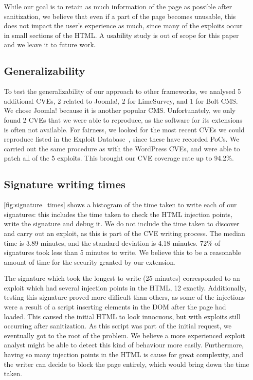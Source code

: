 While our goal is to retain as much information of the page as
possible after sanitization, we believe that even if a part of the
page becomes unusable, this does not impact the user's experience as
much, since many of the exploits occur in small sections of the
HTML. A usability study is out of scope for this paper and we leave it
to future work.


\subsection{Generalizability} \label{generalizability}

To test the generalizability of our approach to other frameworks, we
analysed 5 additional CVEs, 2 related to Joomla!, 2 for LimeSurvey,
and 1 for Bolt CMS.  We chose Joomla! because it is another
popular \ac{CMS}. Unfortunately, we only found 2 CVEs
that we were able to reproduce, as the software for its extensions is
often not available. For fairness, we looked for the most recent CVEs
we could reproduce listed in the Exploit Database~\cite{exploitdb}, since
these have recorded \acp{PoC}. We carried out the same
procedure as with the WordPress CVEs, and were able to patch all of
the 5 exploits. This brought our CVE coverage rate up to 94.2\%.

\subsection{Signature writing times} \label{signature_times}

 \autoref{fig:signature_times} shows a histogram of the time taken to write each of our signatures: this includes the time taken to check the HTML injection points, write the signature and debug it. We do not include the time taken to discover and carry out an exploit, as this is part of the CVE writing process. The median time is 3.89 minutes, and the standard deviation is 4.18 minutes. 72\% of signatures took less than 5 minutes to write. We believe this to be a reasonable amount of time for the security granted by our extension.

The signature which took the longest to write (25 minutes) corresponded to an exploit which had several injection points in the HTML, 12 exactly. Additionally, testing this signature proved more difficult than others, as some of the injections were a result of a script inserting elements in the DOM after the page had loaded. This caused the initial HTML to look innocuous, but with exploits still occurring after sanitization. As this script was part of the initial request, we eventually got to the root of the problem. We believe a more experienced exploit analyst might be able to detect this kind of behaviour more easily. Furthermore, having so many injection points in the HTML is cause for great complexity, and the writer can decide to block the page entirely, which would bring down the time taken.

